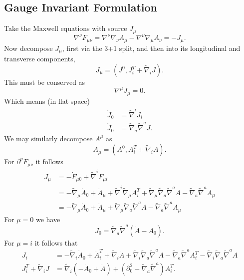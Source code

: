 \documentclass[10pt,letterpaper]{article}
\numberwithin{equation}{subsection}
\begin{document}
\subsection{Gauge Invariant Formulation}
Take the Maxwell equations with source $J_{\mu}$
\begin{equation}
	\nabla^\nu F_{\mu\nu} = \nabla ^\nu\nabla_\nu A_\mu - \nabla^\nu \nabla_\mu A_\nu =  -J_\mu.
\end{equation}
Now decompose $J_{\mu}$, first via the 3+1 split, and then into its longitudinal and transverse components, 
\begin{equation}
J_{\mu} = (J^0, J_i^T+ \tilde\nabla_i J).
\end{equation}
This must be conserved as
\begin{equation}
 \nabla^\mu J_{\mu} = 0.
\end{equation}
Which means (in flat space)
\begin{align}
\dot J_0 &= \tilde\nabla^i J_i\\
\dot J_0&= \tilde\nabla_a \tilde\nabla^a J.
\end{align}
We may similarly decompose $A^\mu$ as
\begin{equation}
A_\mu = (A^0, A_i^T + \tilde\nabla_i A).
\end{equation}
For $\partial^\nu F_{\mu\nu}$ it follows
\begin{align}
J_\mu &= -\dot F_{\mu 0} + \tilde\nabla^i F_{\mu i}
\nonumber \\
&=  - \tilde\nabla_\mu \dot A_0 + \ddot A_\mu + \tilde\nabla^i \tilde\nabla_\mu A_i^T + \tilde\nabla_\mu \tilde\nabla_a\tilde\nabla^a A  - \tilde\nabla_a \tilde\nabla^a A_\mu
\nonumber \\
&= - \tilde\nabla_\mu \dot A_0 + \ddot A_\mu  + \tilde\nabla_\mu \tilde\nabla_a\tilde\nabla^a A  - \tilde\nabla_a \tilde\nabla^a A_\mu
\end{align}
For $\mu = 0$ we have
\begin{equation}
J_0 = \tilde\nabla_a \tilde\nabla^a\left( \dot A - A_0\right ).
\end{equation}
For $\mu = i$ it follows that
\begin{align}
J_i &= -\tilde\nabla_i \dot A_0 + \ddot A_i^T + \tilde\nabla_i \ddot A + \tilde\nabla_i \tilde\nabla_a\tilde\nabla^a A - \tilde\nabla_a\tilde\nabla^a A_i^T - \tilde\nabla_i \tilde\nabla_a\tilde\nabla^a A
\nonumber\\
J_i^T + \tilde\nabla_i J &= \tilde\nabla_i \left( -\dot A_0 + \ddot A\right) + \left(\partial_0^2 - \tilde\nabla_a\tilde\nabla^a\right)A_i^T.
\end{align}
\end{document}
